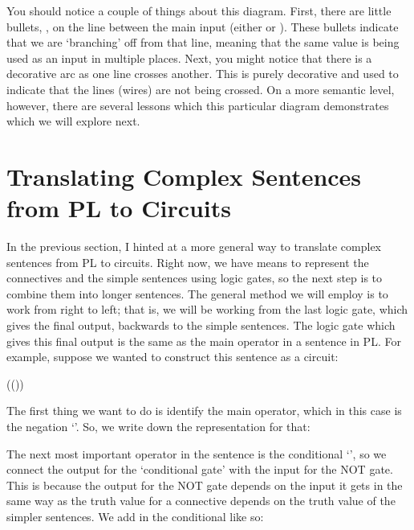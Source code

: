 You should notice a couple of things about this diagram. First, there are little bullets, \textbullet,  on the line between the main input (either  or ). These bullets indicate that we are `branching' off from that line, meaning that the same value is being used as an input in multiple places. Next, you might notice that there is a decorative arc as one line crosses another. This is purely decorative and used to indicate that the lines (wires) are not being crossed. On a more semantic level, however, there are several lessons which this particular diagram demonstrates which we will explore next.

\section{Translating Complex Sentences from PL to Circuits}

In the previous section, I hinted at a more general way to translate complex sentences from PL to circuits. Right now, we have means to represent the connectives and the simple sentences using logic gates, so the next step is to combine them into longer sentences. The general method we will employ is to work from right to left; that is, we will be working from the last logic gate, which gives the final output, backwards to the simple sentences. The logic gate which gives this final output is the same as the main operator in a sentence in PL. For example, suppose we wanted to construct this sentence as a circuit:

\begin{center}
\enot(\eif (\eand{}))
\end{center}

The first thing we want to do is identify the main operator, which in this case is the negation `\enot'. So, we write down the representation for that:


The next most important operator in the sentence is the conditional `\eif', so we connect the output for the `conditional gate' with the input for the NOT gate. This is because the output for the NOT gate depends on the input it gets in the same way as the truth value for a connective depends on the truth value of the simpler sentences. We add in the conditional like so:

